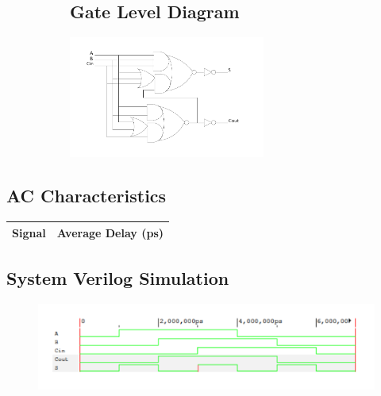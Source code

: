 \begin{figure}[ht!]
\begin{subfigure}[b]{0.7\textwidth}
				\subsection*{Gate Level Diagram}
                \includegraphics[width=\textwidth,height=4cm,keepaspectratio]{../fulladder/circuitdiagram.pdf}
        \end{subfigure}
\end{figure}



\subsection*{AC Characteristics}
\begin{table}[h!]
\centering
\begin{tabular}{cc}
Signal & Average Delay (ps) \\ \hline
 
\end{tabular}
\end{table}

\subsection*{System Verilog Simulation} 
\begin{figure}[h!] 
\centering 
\includegraphics[width=\textwidth]{../fulladder/sv.pdf} 
\end{figure}